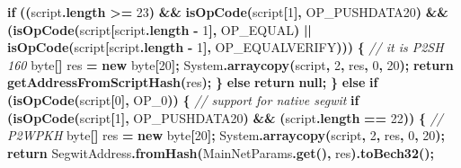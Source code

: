 \documentclass[
  italian,
  openany]{book}
\newenvironment{Shaded}{\begin{snugshade}}{\end{snugshade}}
\newcommand{\BuiltInTok}[1]{#1}
\newcommand{\CommentTok}[1]{\textcolor[rgb]{0.56,0.35,0.01}{\textit{#1}}}
\newcommand{\ControlFlowTok}[1]{\textcolor[rgb]{0.13,0.29,0.53}{\textbf{#1}}}
\newcommand{\DataTypeTok}[1]{\textcolor[rgb]{0.13,0.29,0.53}{#1}}
\newcommand{\DecValTok}[1]{\textcolor[rgb]{0.00,0.00,0.81}{#1}}
\newcommand{\FunctionTok}[1]{\textcolor[rgb]{0.13,0.29,0.53}{\textbf{#1}}}
\newcommand{\KeywordTok}[1]{\textcolor[rgb]{0.13,0.29,0.53}{\textbf{#1}}}
\newcommand{\NormalTok}[1]{#1}
\newcommand{\OperatorTok}[1]{\textcolor[rgb]{0.81,0.36,0.00}{\textbf{#1}}}
\begin{document}
\begin{Shaded}
\begin{Highlighting}[]
        \ControlFlowTok{if} \OperatorTok{((}\NormalTok{script}\OperatorTok{.}\FunctionTok{length} \OperatorTok{\textgreater{}=} \DecValTok{23}\OperatorTok{)} \OperatorTok{\&\&} \FunctionTok{isOpCode}\OperatorTok{(}\NormalTok{script}\OperatorTok{[}\DecValTok{1}\OperatorTok{],}\NormalTok{ OP\_PUSHDATA20}\OperatorTok{)}
            \OperatorTok{\&\&} \OperatorTok{(}\FunctionTok{isOpCode}\OperatorTok{(}\NormalTok{script}\OperatorTok{[}\NormalTok{script}\OperatorTok{.}\FunctionTok{length} \OperatorTok{{-}} \DecValTok{1}\OperatorTok{],}\NormalTok{ OP\_EQUAL}\OperatorTok{)}
             \OperatorTok{||} \FunctionTok{isOpCode}\OperatorTok{(}\NormalTok{script}\OperatorTok{[}\NormalTok{script}\OperatorTok{.}\FunctionTok{length} \OperatorTok{{-}} \DecValTok{1}\OperatorTok{],}\NormalTok{ OP\_EQUALVERIFY}\OperatorTok{)))} \OperatorTok{\{}
            \CommentTok{// it is P2SH 160}
            \DataTypeTok{byte}\OperatorTok{[]}\NormalTok{ res }\OperatorTok{=} \KeywordTok{new} \DataTypeTok{byte}\OperatorTok{[}\DecValTok{20}\OperatorTok{];}
            \BuiltInTok{System}\OperatorTok{.}\FunctionTok{arraycopy}\OperatorTok{(}\NormalTok{script}\OperatorTok{,} \DecValTok{2}\OperatorTok{,}\NormalTok{ res}\OperatorTok{,} \DecValTok{0}\OperatorTok{,} \DecValTok{20}\OperatorTok{);}
            \ControlFlowTok{return} \FunctionTok{getAddressFromScriptHash}\OperatorTok{(}\NormalTok{res}\OperatorTok{);}
        \OperatorTok{\}} \ControlFlowTok{else} \ControlFlowTok{return} \KeywordTok{null}\OperatorTok{;}
    \OperatorTok{\}} \ControlFlowTok{else} \ControlFlowTok{if} \OperatorTok{(}\FunctionTok{isOpCode}\OperatorTok{(}\NormalTok{script}\OperatorTok{[}\DecValTok{0}\OperatorTok{],}\NormalTok{ OP\_0}\OperatorTok{))} \OperatorTok{\{}
        \CommentTok{// support for native segwit}
        \ControlFlowTok{if} \OperatorTok{(}\FunctionTok{isOpCode}\OperatorTok{(}\NormalTok{script}\OperatorTok{[}\DecValTok{1}\OperatorTok{],}\NormalTok{ OP\_PUSHDATA20}\OperatorTok{)} \OperatorTok{\&\&} \OperatorTok{(}\NormalTok{script}\OperatorTok{.}\FunctionTok{length} \OperatorTok{==} \DecValTok{22}\OperatorTok{))} \OperatorTok{\{}
            \CommentTok{// P2WPKH}
            \DataTypeTok{byte}\OperatorTok{[]}\NormalTok{ res }\OperatorTok{=} \KeywordTok{new} \DataTypeTok{byte}\OperatorTok{[}\DecValTok{20}\OperatorTok{];}
            \BuiltInTok{System}\OperatorTok{.}\FunctionTok{arraycopy}\OperatorTok{(}\NormalTok{script}\OperatorTok{,} \DecValTok{2}\OperatorTok{,}\NormalTok{ res}\OperatorTok{,} \DecValTok{0}\OperatorTok{,} \DecValTok{20}\OperatorTok{);}
            \ControlFlowTok{return}\NormalTok{ SegwitAddress}\OperatorTok{.}\FunctionTok{fromHash}\OperatorTok{(}\NormalTok{MainNetParams}\OperatorTok{.}\FunctionTok{get}\OperatorTok{(),}\NormalTok{ res}\OperatorTok{).}\FunctionTok{toBech32}\OperatorTok{();}

\end{Highlighting}
\end{Shaded}
\end{document}
